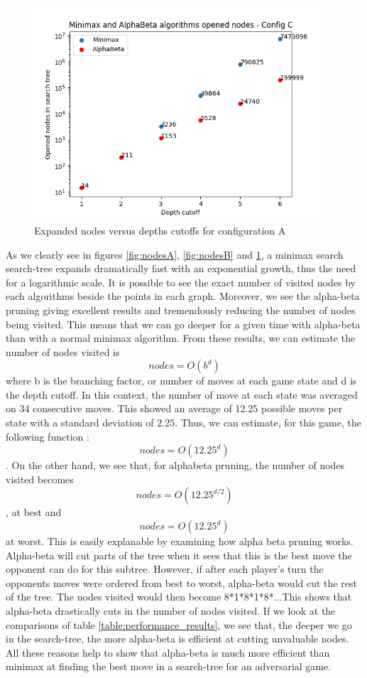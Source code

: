 \documentclass{article}
\begin{document}
		\begin{figure}
		\hfill\includegraphics[height=8cm]{configC_nodes_depth.png}\hspace*{\fill}
		\caption{ Expanded nodes versus depths cutoffs for configuration A}
		\label{fig:nodesC}
	\end{figure} 
As we clearly see in figures \ref{fig:nodesA}, \ref{fig:nodesB} and \ref{fig:nodesC}, a minimax search search-tree expands dramatically fast with an exponential growth, thus the need for a logarithmic scale. It is possible to see the exact number of visited nodes by each algorithms beside the points in each graph. Moreover, we see the alpha-beta pruning giving excellent results and tremendously reducing the number of nodes being visited. This means that we can go deeper for a given time with alpha-beta than with a normal minimax algorithm. From these results, we can estimate the number of nodes visited is \[nodes = O(b^d) \] where b is the branching factor, or number of moves at each game state and d is the depth cutoff. In this context, the number of move at each state was averaged on 34 consecutive moves. This showed an average of 12.25 possible moves per state with a standard deviation of 2.25. Thus, we can estimate, for this game, the following function : \[nodes = O(12.25^d) \]. On the other hand, we see that, for alphabeta pruning, the number of nodes visited becomes \[nodes = O(12.25^{d/2}) \], at best and \[nodes = O(12.25^d) \] at worst. This is easily explanable by examining how alpha beta pruning works. Alpha-beta will cut parts of the tree when it sees that this is the best move the opponent can do for this subtree. However, if after each player's turn the opponents moves were ordered from best to worst, alpha-beta would cut the rest of the tree. The nodes visited would then become 8*1*8*1*8*...This shows that alpha-beta drastically cuts in the number of nodes visited. If we look at the comparisons of table \ref{table:performance_results}, we see that, the deeper we go in the search-tree, the more alpha-beta is efficient at cutting unvaluable nodes. 
All these reasons help to show that alpha-beta is much more efficient than minimax at finding the best move in a search-tree for an adversarial game.
\end{document}
